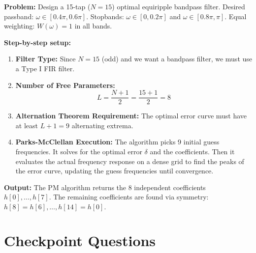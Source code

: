 \documentclass[11pt,a4paper]{article}
\begin{document}
\textbf{Problem:} Design a 15-tap ($N=15$) optimal equiripple bandpass filter. 
Desired passband: $\omega \in [0.4\pi, 0.6\pi]$.
Stopbands: $\omega \in [0, 0.2\pi]$ and $\omega \in [0.8\pi, \pi]$.
Equal weighting: $W(\omega) = 1$ in all bands.

\textbf{Step-by-step setup:}
\begin{enumerate}
    \item \textbf{Filter Type:} Since $N=15$ (odd) and we want a bandpass filter, we must use a Type I FIR filter.
    \item \textbf{Number of Free Parameters:}
    \begin{equation}
    L = \frac{N+1}{2} = \frac{15+1}{2} = 8
    \end{equation}
    \item \textbf{Alternation Theorem Requirement:}
    The optimal error curve must have at least $L+1 = 9$ alternating extrema.
    \item \textbf{Parks-McClellan Execution:}
    The algorithm picks 9 initial guess frequencies. It solves for the optimal error $\delta$ and the coefficients. Then it evaluates the actual frequency response on a dense grid to find the peaks of the error curve, updating the guess frequencies until convergence.
\end{enumerate}

\textbf{Output:} The PM algorithm returns the 8 independent coefficients $h[0], \dots, h[7]$. The remaining coefficients are found via symmetry: $h[8] = h[6], \dots, h[14] = h[0]$.

\section{Checkpoint Questions}
\end{document}
